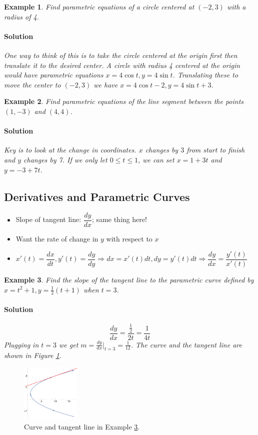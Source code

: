 \documentclass[letterpaper, 11pt, openany]{book}
\theoremstyle{mytheoremstyle}
\theoremstyle{myexamplestyle}
\newtheorem{example}{Example}[section]
\newenvironment{solution}{\paragraph{\sffamily \smaller \fontseries{b}\selectfont Solution}}{\hfill\faSquare}
\begin{document}
\begin{example}
    Find parametric equations of a circle centered at \((-2, 3)\) with a radius of 4.
    \begin{solution}
        One way to think of this is to take the circle centered at the origin first then translate it to the desired center. A circle with radius 4 centered at the origin would have parametric equations \(x = 4 \cos t, y = 4 \sin t\). Translating these to move the center to \((-2, 3)\) we have \(x = 4\cos t - 2, y = 4\sin t + 3\).
    \end{solution}
\end{example}

\begin{example}
    Find parametric equations of the line segment between the points \((1, -3)\) and \((4,4)\).
    \begin{solution}
        Key is to look at the change in coordinates. \(x\) changes by \(3\) from start to finish and \(y\) changes by 7. If we only let \(0 \leq t \leq 1\), we can set \(x = 1 + 3t\) and \(y = -3 + 7t\).
    \end{solution}
\end{example}

\subsection{Derivatives and Parametric Curves}

\begin{itemize}
    \item Slope of tangent line: $\dfrac{dy}{dx}$; same thing here!
    \item Want the rate of change in $y$ with respect to $x$
    \item $x'(t) = \dfrac{dx}{dt}, y'(t) = \dfrac{dy}{dy} \Rightarrow dx = x'(t) dt, dy = y'(t) dt \Rightarrow \dfrac{dy}{dx} = \dfrac{y'(t)}{x'(t)}$
\end{itemize}

\begin{example}\label{e:paraslope}
    Find the slope of the tangent line to the parametric curve defined by $x = t^{2} + 1, y = \frac{1}{2}(t+1)$ when $t = 3$.
    \begin{solution}
        \[\frac{dy}{dx} = \frac{\frac{1}{2}}{2t} = \frac{1}{4t}\]
        Plugging in $t = 3$ we get $\displaystyle m = \frac{dy}{dx}\bigg|_{t = 3} = \frac{1}{12}$. The curve and the tangent line are shown in Figure \ref{f:paraslope}.
    \end{solution}
\end{example}
\begin{figure}[htbp]
    \centering
        \includegraphics[width=0.25\textwidth]{Figures/paraslope.pdf}
    \caption{Curve and tangent line in Example \ref{e:paraslope}.}
    \label{f:paraslope}
\end{figure}
\end{document}
